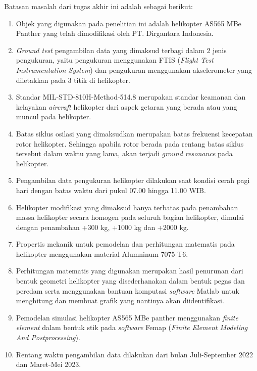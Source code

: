 Batasan masalah dari tugas akhir ini adalah sebagai berikut:

\begin{enumerate}[nolistsep]

  \item Objek yang digunakan pada penelitian ini adalah helikopter AS565 MBe Panther yang telah dimodifikasi oleh PT. Dirgantara Indonesia.
  
  \item \textit{Ground test} pengambilan data yang dimaksud terbagi dalam 2 jenis pengukuran, yaitu pengukuran menggunakan FTIS (\textit{Flight Test Instrumentation System}) dan pengukuran menggunakan akselerometer yang diletakkan pada 3 titik di helikopter.
  
  \item Standar MIL-STD-810H-Method-514.8 merupakan standar keamanan dan kelayakan \textit{aircraft} helikopter dari aspek getaran yang berada atau yang muncul pada helikopter.
  
  \item Batas siklus osilasi yang dimaksudkan merupakan batas frekuensi kecepatan rotor helikopter. Sehingga apabila rotor berada pada rentang batas siklus tersebut dalam waktu yang lama, akan terjadi \textit{ground resonance} pada helikopter.
  
  \item Pengambilan data pengukuran helikopter dilakukan saat kondisi cerah pagi hari dengan batas waktu dari pukul 07.00 hingga 11.00 WIB.
    
  \item Helikopter modifikasi yang dimaksud hanya terbatas pada penambahan massa helikopter secara homogen pada seluruh bagian helikopter, dimulai dengan penambahan +300 kg, +1000 kg dan +2000 kg.
  
  \item Propertis mekanik untuk pemodelan dan perhitungan matematis pada helikopter menggunakan material Alumninum 7075-T6.
 
  \item Perhitungan matematis yang digunakan merupakan hasil penurunan dari bentuk geometri helikopter yang disederhanakan dalam bentuk pegas dan peredam serta menggunakan bantuan komputasi \textit{software} Matlab untuk menghitung dan membuat grafik yang nantinya akan diidentifikasi.

  \item Pemodelan simulasi helikopter AS565 MBe panther menggunakan \textit{finite element} dalam bentuk stik pada \textit{software} Femap (\textit{Finite Element Modeling And Postprocessing}).
  
  \item Rentang waktu pengambilan data dilakukan dari bulan Juli-September 2022 dan Maret-Mei 2023.

\end{enumerate}

